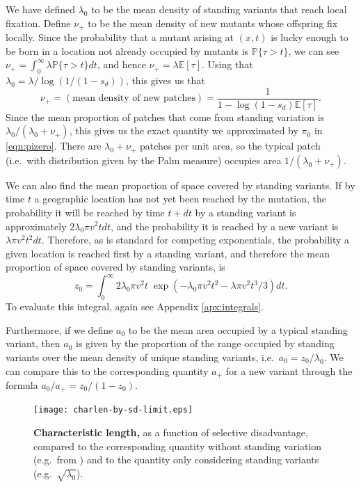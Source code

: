 \documentclass{article}
\renewcommand{\P}{\mathbb{P}}
\newcommand{\E}{\mathbb{E}}
\begin{document}
We have defined $\lambda_0$ to be the mean density of standing variants that reach local fixation.
Define $\nu_+$ to be the mean density of new mutants whose offspring fix locally.
Since the probability that a mutant arising at $(x,t)$ is lucky enough to be born in a location not already occupied by mutants
is $\P\{ \tau > t \}$,
we can see  $\nu_+ = \int_0^\infty \lambda \P\{\tau>t\} dt$, and hence
$\nu_+ = \lambda \E[\tau] $.
Using that $\lambda_0 = \lambda / \log(1/(1-s_d))$, this gives us that
\begin{equation}
    \nu_+ = (\mbox{mean density of new patches}) = \frac{1}{1-\log(1-s_d) \E[\tau]} .
\end{equation}
Since the mean proportion of patches that come from standing variation is $\lambda_0 / (\lambda_0 + \nu_+)$,
this gives us the exact quantity we approximated by $\pi_0$ in \eqref{eqn:pizero}.
There are $\lambda_0 + \nu_+$ patches per unit area, so
the typical patch (i.e.\ with distribution given by the Palm measure) occupies area $1/(\lambda_0 + \nu_+)$.

We can also find the mean proportion of space covered by standing variants.
If by time $t$ a geographic location has not yet been reached by the mutation,
the probability it will be reached by time $t+dt$ 
by a standing variant is approximately $2 \lambda_0 \pi v^2 t dt$, 
and the probability it is reached by a new variant is $\lambda \pi v^2 t^2 dt$.
Therefore, as is standard for competing exponentials,
the probability a given location is reached first by a standing variant,
and therefore the mean proportion of space covered  by standing variants,
is
\begin{equation}
    z_0 = \int_0^\infty {2 \lambda_0 \pi v^2 t} \; \exp \left( - \lambda_0 \pi v^2 t^2 - \lambda \pi v^2 t^3 / 3 \right) dt .
\end{equation}
To evaluate this integral, again see Appendix \ref{apx:integrals}.

Furthermore, if we define $a_0$ to be the mean area occupied by a typical standing variant, 
then $a_0$ is given by the proportion of the range occupied by standing variants over the mean density of unique standing variants,
i.e.\ $a_0 = z_0 / \lambda_0$.
We can compare this to the corresponding quantity $a_+$ for a new variant through the formula
$a_0 / a_+ = z_0 / (1-z_0)$.

\begin{figure}[ht]
\begin{center}
\texttt{[image: charlen-by-sd-limit.eps]}
\caption{ %
{\bf Characteristic length,} as a function of selective disadvantage, compared to the corresponding quantity without standing variation (e.g.\ from \cite{ralphcoop2010}) and to the quantity only considering standing variants (e.g.\ $\sqrt{\lambda_0}$).
}
\end{center}
\end{figure}
\end{document}
